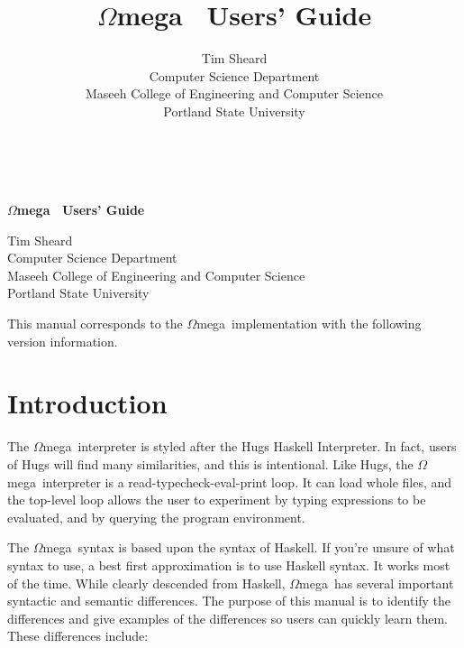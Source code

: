 \documentclass[11pt,twoside]{article}
\newcommand{\om}{$\Omega$mega}
\begin{document}
\pagestyle{empty}
~
\begin{center}
{\sf
\vspace{0.5cm}
{\bf {\Large \om~ Users' Guide}}\\
\vspace{0.5cm}

{\large Tim Sheard}\\
Computer Science Department\\
Maseeh College of Engineering and Computer Science\\
Portland State University\\
}
\end{center}

\tableofcontents

\newpage
This manual corresponds to the \om\ implementation with the
following version information.

\begin{center}

\end{center}




\newpage
\pagestyle{plain}

\setcounter{page}{1}


\title{\om~ Users' Guide}
\author{
Tim Sheard\\
Computer Science Department\\
Maseeh College of Engineering and Computer Science\\
Portland State University\\
}


\maketitle

\section{Introduction}\label{intro}

The \om\ interpreter is styled after the Hugs Haskell Interpreter. In fact,
users of Hugs will find many similarities, and this is intentional. Like Hugs,
the \om\ interpreter is a read-typecheck-eval-print loop. It can load whole
files, and the top-level loop allows the user to experiment by typing
expressions to be evaluated, and by querying the program environment.

The \om\ syntax is based upon the syntax of Haskell. If you're unsure
of what syntax to use, a best first approximation is to use Haskell
syntax. It works most of the time. While clearly descended from Haskell,
\om\ has several important syntactic and semantic differences. The
purpose of this manual is to identify the differences and give
examples of the differences so users can quickly learn them. These
differences include:
\end{document}
